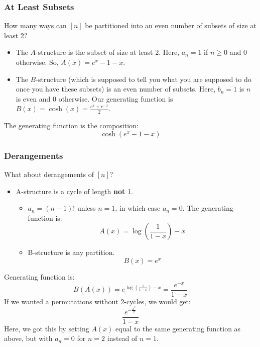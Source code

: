 \documentclass[letterpaper]{article}
\begin{document}
\subsubsection{At Least Subsets}
How many ways can $[n]$ be partitioned into an even number of subsets of size at least 2?
\begin{itemize}
    \item The $A$-structure is the subset of size at least 2. Here, $a_n = 1$ if $n \geq 0$ and 0 otherwise. So, $A(x) = e^x - 1 - x$. 
    \item The $B$-structure (which is supposed to tell you what you are supposed to do once you have these subsets) is an even number of subsets. Here, $b_n = 1$ is $n$ is even and 0 otherwise. Our generating function is $B(x) = \cosh(x) = \frac{e^x + e^{-x}}{2}$. 
\end{itemize}
The generating function is the composition:
\[\cosh(e^x - 1 - x)\]

\subsubsection{Derangements}
What about derangements of $[n]$? 
\begin{itemize}
    \item A-structure is a cycle of length \textbf{not} 1.
    \begin{itemize}
        \item $a_n = (n - 1)!$ unless $n = 1$, in which case $a_n = 0$. The generating function is:
        \[A(x) = \log\left(\frac{1}{1 - x}\right) - x\]

        \item B-structure is any partition. 
        \[B(x) = e^x\]
    \end{itemize}
\end{itemize}
Generating function is:
\[B(A(x)) = e^{\log\left(\frac{1}{1 - x}\right) - x} = \frac{e^{-x}}{1 - x}\]
If we wanted a permutations without 2-cycles, we would get:
\[\frac{e^{-\frac{x^2}{2}}}{1 - x}\]
Here, we got this by setting $A(x)$ equal to the same generating function as above, but with $a_n = 0$ for $n = 2$ instead of $n = 1$.
\end{document}
